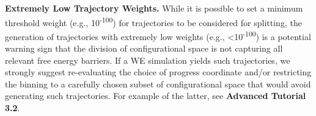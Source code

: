 \textbf{Extremely Low Trajectory Weights.} While it is possible to set a minimum threshold weight (e.g., 10\textsuperscript{-100}) for trajectories to be considered for splitting, the generation of trajectories with extremely low weights (e.g., <10\textsuperscript{-100}) is a potential warning sign that the division of configurational space is not capturing all relevant free energy barriers. 
If a WE simulation yields such trajectories, we strongly suggest re-evaluating the choice of progress coordinate and/or restricting the binning to a carefully chosen subset of configurational space that would avoid generating such trajectories.
For example of the latter, see \textbf{Advanced Tutorial 3.2}.
